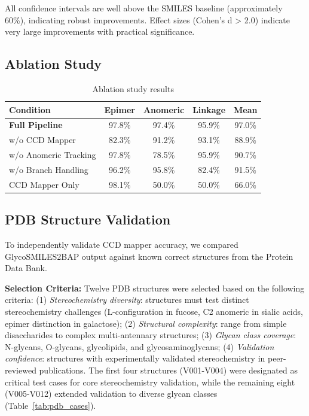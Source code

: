 \documentclass[11pt,a4paper]{article}
\begin{document}
All confidence intervals are well above the SMILES baseline (approximately 60\%), indicating robust improvements. Effect sizes (Cohen's d > 2.0) indicate very large improvements with practical significance.

\subsection{Ablation Study}

\begin{table}[h]
\centering
\begin{tabular}{lcccc}
\toprule
Condition & Epimer & Anomeric & Linkage & Mean \\
\midrule
\textbf{Full Pipeline} & 97.8\% & 97.4\% & 95.9\% & 97.0\% \\
w/o CCD Mapper & 82.3\% & 91.2\% & 93.1\% & 88.9\% \\
w/o Anomeric Tracking & 97.8\% & 78.5\% & 95.9\% & 90.7\% \\
w/o Branch Handling & 96.2\% & 95.8\% & 82.4\% & 91.5\% \\
CCD Mapper Only & 98.1\% & 50.0\% & 50.0\% & 66.0\% \\
\bottomrule
\end{tabular}
\caption{Ablation study results}
\end{table}

\subsection{PDB Structure Validation}

To independently validate CCD mapper accuracy, we compared GlycoSMILES2BAP output against known correct structures from the Protein Data Bank. 

\textbf{Selection Criteria:} Twelve PDB structures were selected based on the following criteria: (1) \textit{Stereochemistry diversity}: structures must test distinct stereochemistry challenges (L-configuration in fucose, C2 anomeric in sialic acids, epimer distinction in galactose); (2) \textit{Structural complexity}: range from simple disaccharides to complex multi-antennary structures; (3) \textit{Glycan class coverage}: N-glycans, O-glycans, glycolipids, and glycosaminoglycans; (4) \textit{Validation confidence}: structures with experimentally validated stereochemistry in peer-reviewed publications. The first four structures (V001-V004) were designated as critical test cases for core stereochemistry validation, while the remaining eight (V005-V012) extended validation to diverse glycan classes (Table~\ref{tab:pdb_cases}).
\end{document}
